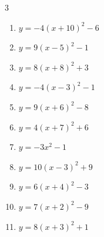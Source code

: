 \begin{multicols}{3}
\begin{enumerate}
  \item $\displaystyle y=-4\left( x+10\right)^{2}-6$

        \phantom{$\displaystyle 頂点\left( -10 , -6 \right)$}

  \item $\displaystyle y=9\left( x-5\right)^{2}-1$

        \phantom{$\displaystyle 頂点\left( 5 , -1 \right)$}

  \item $\displaystyle y=8\left( x+8\right)^{2}+3$

        \phantom{$\displaystyle 頂点\left( -8 , 3 \right)$}

  \item $\displaystyle y=-4\left( x-3\right)^{2}-1$

        \phantom{$\displaystyle 頂点\left( 3 , -1 \right)$}

  \item $\displaystyle y=9\left( x+6\right)^{2}-8$

        \phantom{$\displaystyle 頂点\left( -6 , -8 \right)$}

  \item $\displaystyle y=4\left( x+7\right)^{2}+6$

        \phantom{$\displaystyle 頂点\left( -7 , 6 \right)$}

\columnbreak %

  \item $\displaystyle y=-3x^{2}-1$

        \phantom{$\displaystyle 頂点\left( 0 , -1 \right)$}

  \item $\displaystyle y=10\left( x-3\right)^{2}+9$

        \phantom{$\displaystyle 頂点\left( 3 , 9 \right)$}

  \item $\displaystyle y=6\left( x+4\right)^{2}-3$

        \phantom{$\displaystyle 頂点\left( -4 , -3 \right)$}

  \item $\displaystyle y=7\left( x+2\right)^{2}-9$

        \phantom{$\displaystyle 頂点\left( -2 , -9 \right)$}

  \item $\displaystyle y=8\left( x+3\right)^{2}+1$

        \phantom{$\displaystyle 頂点\left( -3 , 1 \right)$}


\end{enumerate}
\end{multicols}
